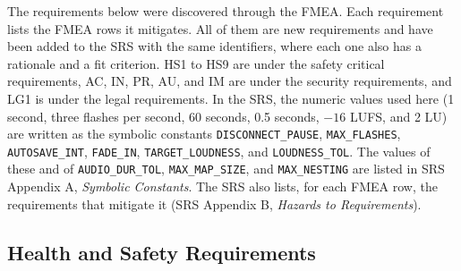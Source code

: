 \documentclass{article}
\begin{document}
The requirements below were discovered through the FMEA. Each requirement
lists the FMEA rows it mitigates. All of them are new requirements and have been
added to the SRS with the same identifiers, where each one also has a rationale
and a fit criterion. HS1 to HS9 are under the safety critical requirements,
AC, IN, PR, AU, and IM are under the security requirements, and LG1 is under
the legal requirements. In the SRS, the numeric values used here (1 second, three
flashes per second, 60 seconds, 0.5 seconds, $-16$ LUFS, and 2 LU) are written
as the symbolic constants \texttt{DISCONNECT\_PAUSE}, \texttt{MAX\_FLASHES},
\texttt{AUTOSAVE\_INT}, \texttt{FADE\_IN}, \texttt{TARGET\_LOUDNESS}, and
\texttt{LOUDNESS\_TOL}. The values of these and of \texttt{AUDIO\_DUR\_TOL},
\texttt{MAX\_MAP\_SIZE}, and \texttt{MAX\_NESTING} are listed in SRS
Appendix A, \emph{Symbolic Constants}. The SRS also lists, for each FMEA row, the requirements
that mitigate it (SRS Appendix B, \emph{Hazards to Requirements}).

\subsection{Health and Safety Requirements}
\end{document}
